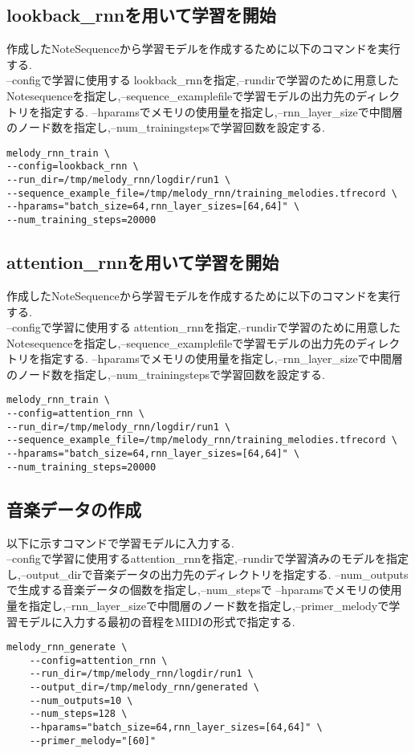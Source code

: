\subsection{lookback\_rnnを用いて学習を開始}
作成したNoteSequenceから学習モデルを作成するために以下のコマンドを実行する.\\
--configで学習に使用するlookback\_rnnを指定,--rundirで学習のために用意したNotesequenceを指定し,--sequence\_examplefileで学習モデルの出力先のディレクトリを指定する.
--hparamsでメモリの使用量を指定し,--rnn\_layer\_sizeで中間層のノード数を指定し,--num\_trainingstepsで学習回数を設定する.\\
\begin{lstlisting}[basicstyle=\ttfamily\footnotesize,frame=single]
melody_rnn_train \
--config=lookback_rnn \
--run_dir=/tmp/melody_rnn/logdir/run1 \
--sequence_example_file=/tmp/melody_rnn/training_melodies.tfrecord \
--hparams="batch_size=64,rnn_layer_sizes=[64,64]" \
--num_training_steps=20000
\end{lstlisting}
\subsection{attention\_rnnを用いて学習を開始}
作成したNoteSequenceから学習モデルを作成するために以下のコマンドを実行する.\\
--configで学習に使用するattention\_rnnを指定,--rundirで学習のために用意したNotesequenceを指定し,--sequence\_examplefileで学習モデルの出力先のディレクトリを指定する.
--hparamsでメモリの使用量を指定し,--rnn\_layer\_sizeで中間層のノード数を指定し,--num\_trainingstepsで学習回数を設定する.\\
\begin{lstlisting}[basicstyle=\ttfamily\footnotesize,frame=single]
melody_rnn_train \
--config=attention_rnn \
--run_dir=/tmp/melody_rnn/logdir/run1 \
--sequence_example_file=/tmp/melody_rnn/training_melodies.tfrecord \
--hparams="batch_size=64,rnn_layer_sizes=[64,64]" \
--num_training_steps=20000
\end{lstlisting}
\newpage
\subsection{音楽データの作成}
以下に示すコマンドで学習モデルに入力する.\\
--configで学習に使用するattention\_rnnを指定,--rundirで学習済みのモデルを指定し,--output\_dirで音楽データの出力先のディレクトリを指定する.
--num\_outputsで生成する音楽データの個数を指定し,--num\_stepsで
--hparamsでメモリの使用量を指定し,--rnn\_layer\_sizeで中間層のノード数を指定し,--primer\_melodyで学習モデルに入力する最初の音程をMIDIの形式で指定する.\\
\begin{lstlisting}[basicstyle=\ttfamily\footnotesize,frame=single]
    melody_rnn_generate \
    --config=attention_rnn \
    --run_dir=/tmp/melody_rnn/logdir/run1 \
    --output_dir=/tmp/melody_rnn/generated \
    --num_outputs=10 \
    --num_steps=128 \
    --hparams="batch_size=64,rnn_layer_sizes=[64,64]" \
    --primer_melody="[60]"
\end{lstlisting}
